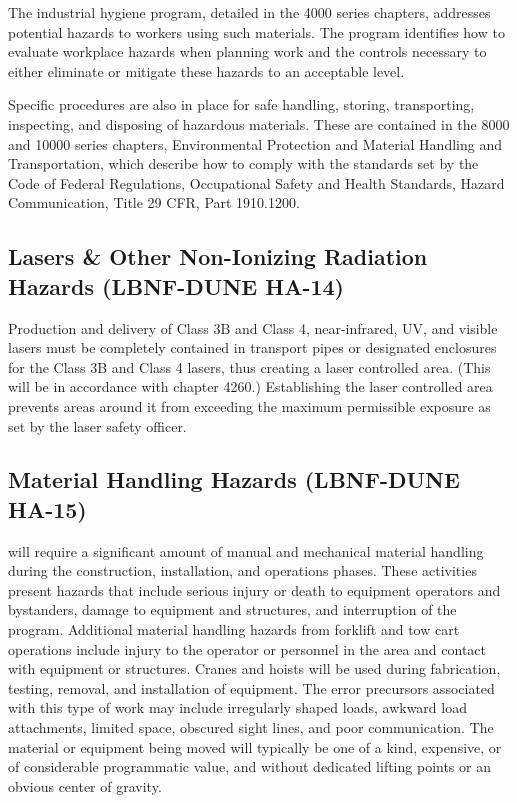 The industrial hygiene program, detailed in the  4000
series chapters, addresses potential hazards to workers using such
materials. The program identifies how to evaluate workplace hazards
when planning work and the controls necessary to either eliminate or
mitigate these hazards to an acceptable level.

Specific procedures are also in place for safe handling, storing,
transporting, inspecting, and disposing of hazardous materials. These
are contained in the  8000 and 10000 series chapters,
Environmental Protection and Material Handling and Transportation,
which describe how to comply with the standards set by the Code of
Federal Regulations, Occupational Safety and Health Standards, Hazard
Communication, Title 29 CFR, Part 1910.1200.


\subsection{Lasers \& Other Non-Ionizing Radiation Hazards (LBNF-DUNE HA-14)}
\label{sec:tc-esh-lasers}

Production and delivery of Class 3B and Class 4, near-infrared, UV,
and visible lasers must be completely contained in transport pipes or
designated enclosures for the Class 3B and Class 4 lasers, thus
creating a laser controlled area. (This will be in accordance with
\fnal {} chapter 4260.)  Establishing the laser controlled
area prevents areas around it from exceeding the maximum permissible
exposure as set by the \fnal laser safety officer.

\subsection{Material Handling Hazards (LBNF-DUNE HA-15)}

 will require a significant amount of manual and mechanical
material handling during the construction, installation, and operations
phases.  %
These activities present hazards that include serious injury or
death to equipment operators and bystanders, damage to equipment and
structures, and interruption of the program.  Additional material
handling hazards from forklift and tow cart operations include injury
to the operator or personnel in the area and contact with equipment or
structures. Cranes and hoists will be used during fabrication,
testing, removal, and installation of equipment. The error precursors
associated with this type of work may include irregularly shaped loads,
awkward load attachments, limited space, obscured sight lines, and
poor communication.  The material or equipment being moved will
typically be one of a kind, expensive, or of considerable programmatic
value, and without dedicated lifting points or an obvious center
of gravity.


